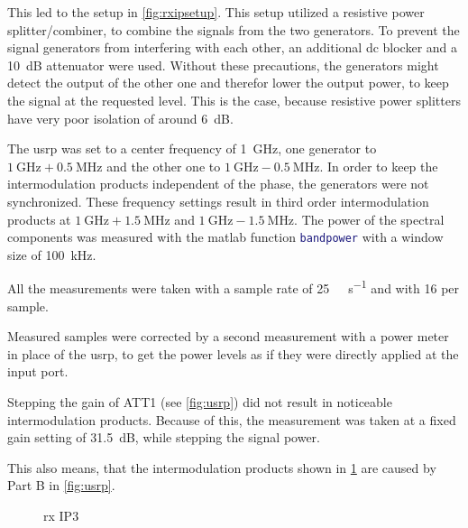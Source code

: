 \documentclass[12pt,a4paper,parskip=full,abstracton]{scrartcl}
\begin{document}
This led to the setup in \cref{fig:rxipsetup}. This setup utilized a resistive power
splitter/combiner, to combine the signals from the two generators. To prevent the signal
generators from interfering with each other, an additional \gls{dc} blocker and a
\SI{10}{\deci\bel} attenuator were used. Without these precautions, the generators
might detect the output of the other one and therefor lower the output power, to keep
the signal at the requested level. This is the case, because resistive power splitters
have very poor isolation of around \SI{6}{\deci\bel}.

The \gls{usrp} was set to a center frequency of \SI{1}{\giga\hertz}, one generator
to $\SI{1}{\giga\hertz} + \SI{0.5}{\mega\hertz}$ and the other one to $\SI{1}{\giga\hertz}
- \SI{0.5}{\mega\hertz}$. In order to keep the intermodulation products independent of the
phase, the generators were not synchronized. These frequency settings result in third order
intermodulation products at $\SI{1}{\giga\hertz} + \SI{1.5}{\mega\hertz}$ and
$\SI{1}{\giga\hertz} - \SI{1.5}{\mega\hertz}$. The power of the spectral components was
measured with the matlab function \lstinline[language=matlab]{bandpower} with a window
size of \SI{100}{\kilo\hertz}.

All the measurements were taken with a sample rate of \SI{25}{\mega\samples\per\second}
and with \SI{16}{\bit} per sample.

Measured samples were corrected by a second measurement with a power meter in place of the
\gls{usrp}, to get the power levels as if they were directly applied at the input port.

Stepping the gain of ATT1 (see \cref{fig:usrp}) did not result in noticeable
intermodulation products. Because of this, the measurement was taken at a fixed
gain setting of \SI{31.5}{\deci\bel}, while stepping the signal power.

This also means, that the intermodulation products shown in \cref{fig:rxip3} are
caused by Part B in \cref{fig:usrp}.

\begin{figure}[htb]
    \centering
{}
    \caption{\gls{rx} IP3}
    \label{fig:rxip3}
\end{figure}
\end{document}
